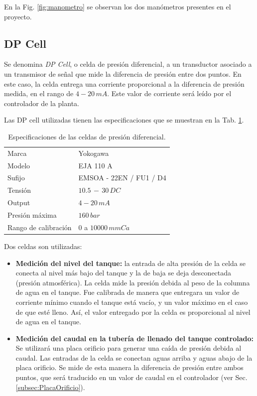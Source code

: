 En la Fig. \ref{fig:manometro} se observan los dos manómetros
presentes en el proyecto.

\subsection{DP Cell}
\label{subsec:DPCell}

Se denomina \textit{DP Cell}, o celda de presión diferencial, a un transductor
asociado a un transmisor de señal
que mide la diferencia de presión entre dos puntos.
En este caso, la celda entrega una corriente proporcional a la diferencia de
presión medida, en el rango de $4-20\,mA$.
Este valor de corriente será leído por el controlador de la planta.

Las DP cell utilizadas tienen las especificaciones que se muestran en la Tab.
\ref{tab:caractDPcell}.

\begin{table}[ht]
\renewcommand{\arraystretch}{1.3}
\centering
\begin{tabular}{|l|l|}
\hline
Marca & Yokogawa\\
Modelo & EJA 110 A\\
Sufijo & EMSOA - 22EN / FU1 / D4\\
Tensión & $10.5\,-\,30 \, DC$\\
Output & $4-20\,mA$\\
Presión máxima & $160\,bar$\\
Rango de calibración & $0$ a $10000\,mmCa$\\
\hline
\end{tabular}
\caption{Especificaciones de las celdas de presión diferencial.}
\label{tab:caractDPcell}
\end{table}

Dos celdas son utilizadas:
\begin{itemize}
 \item \textbf{Medición del nivel del tanque:} la entrada de alta presión de la
celda
se conecta  al nivel más bajo del tanque y la de baja se deja desconectada
(presión atmosférica).
La celda mide la presión debida al peso de la columna de agua en el tanque.
Fue calibrada de manera que entregara un valor de corriente mínimo
cuando el tanque está vacío, y un valor máximo en el caso de que esté
lleno.
Así, el valor entregado por la celda es proporcional al nivel de
agua en el tanque.

\item \textbf{Medición del caudal en la tubería de llenado del tanque
controlado:}
Se utilizará una placa orificio para generar una caída de presión debida al
caudal.
Las entradas de la celda se conectan aguas arriba y aguas abajo
de la placa orificio.
Se mide de esta manera la diferencia de presión entre ambos puntos, que será
traducido en un valor de caudal en el
controlador (ver Sec. \ref{subsec:PlacaOrificio}).
\end{itemize}


